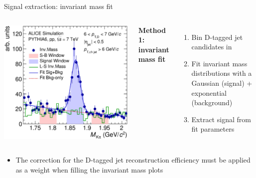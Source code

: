 \documentclass{beamer}
\begin{document}
\begin{frame}{Signal extraction: invariant mass fit}
\begin{columns}

\includegraphics[width=\textwidth]{img/HQ16_Simulation_InvMassSB}

\textbf{\alert{Method 1: invariant mass fit}}
\begin{enumerate}
\item Bin D-tagged jet candidates in \alert{\ptchjet}
\item \alert{Fit invariant mass distributions} with a Gaussian (signal) + exponential (background)
\item Extract signal from fit parameters
\end{enumerate}
\end{columns}
\begin{itemize}
\item The correction for the D-tagged jet reconstruction efficiency must be applied as a weight when filling the invariant mass plots
\end{itemize}
\end{frame}
\end{document}
